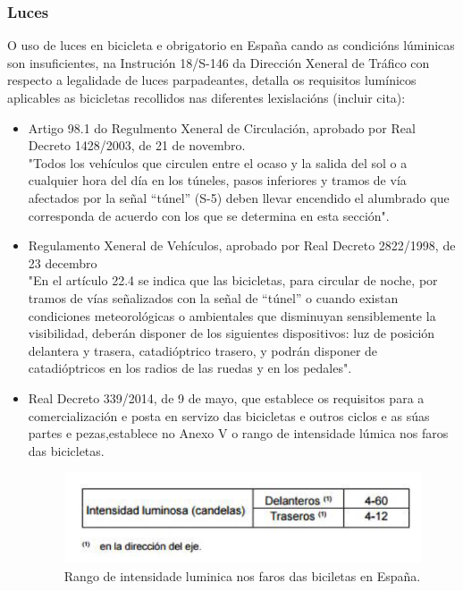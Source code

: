 \subsubsection{Luces}
O uso de luces en bicicleta e obrigatorio en España cando as condicións lúminicas son insuficientes, na Instrución 18/S-146 da Dirección Xeneral de Tráfico con respecto a legalidade de luces parpadeantes, detalla os requisitos lumínicos aplicables as bicicletas recollidos nas diferentes lexislacións (incluir cita):
\begin{itemize}
  \item Artigo  98.1  do  Regulmento  Xeneral  de Circulación, aprobado por Real Decreto 1428/2003, de 21 de novembro.\\
  "Todos los vehículos que circulen entre el ocaso y la salida del sol o a cualquier hora del día en los túneles, pasos inferiores y tramos de vía afectados por la señal “túnel” (S-5) deben llevar encendido el   alumbrado   que   corresponda   de   acuerdo   con   los   que   se determina en esta sección".
  \item  Regulamento Xeneral de Vehículos, aprobado por Real Decreto 2822/1998, de 23 decembro\\
  "En el artículo 22.4 se indica que las bicicletas, para circular de noche, por tramos   de   vías   señalizados   con   la   señal   de   “túnel”   o   cuando   existan condiciones  meteorológicas  o  ambientales  que  disminuyan  sensiblemente  la visibilidad,  deberán  disponer  de  los  siguientes  dispositivos: luz  de  posición delantera   y   trasera,   catadióptrico   trasero,   y   podrán   disponer   de catadióptricos en los radios de las ruedas y en los pedales".
  \item Real Decreto 339/2014, de 9 de mayo, que establece os requisitos para a comercialización e posta en servizo das bicicletas e outros ciclos e as súas partes e pezas,establece no Anexo V o rango de intensidade lúmica nos faros das bicicletas.
  \begin{figure}[h!]
    \centering
    \includegraphics[scale=0.6]{imaxes/lexislacion-luminica.png}
    \caption{Rango de intensidade luminica nos faros das biciletas en España.}
    \label{f:lexislación lumínica}
  \end{figure}
\end{itemize}
